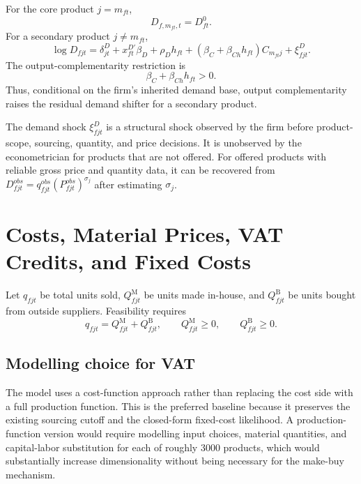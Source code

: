 \documentclass[11pt,a4paper]{article}
\newcommand{\M}{\mathrm{M}}
\newcommand{\B}{\mathrm{B}}
\begin{document}
For the core product $j=m_{ft}$,
\begin{equation}
    D_{f,m_{ft},t}=D^0_{ft}.
    \label{eq:core_demand}
\end{equation}
For a secondary product $j\neq m_{ft}$,
\begin{equation}
    \log D_{fjt}
    =\delta^D_{jt}
    +x^{D\prime}_{ft}\beta_D
    +\rho_D h_{ft}
    +\left(\beta_C+\beta_{Ch}h_{ft}\right)C_{m_{ft}j}
    +\xi^D_{fjt}.
    \label{eq:secondary_demand}
\end{equation}
The output-complementarity restriction is
\begin{equation}
    \beta_C+\beta_{Ch}h_{ft}>0.
    \label{eq:output_restriction}
\end{equation}
Thus, conditional on the firm's inherited demand base, output complementarity raises the residual demand shifter for a secondary product.

The demand shock $\xi^D_{fjt}$ is a structural shock observed by the firm before product-scope, sourcing, quantity, and price decisions. It is unobserved by the econometrician for products that are not offered. For offered products with reliable gross price and quantity data, it can be recovered from $D^{obs}_{fjt}=q^{obs}_{fjt}(P^{obs}_{fjt})^{\sigma_j}$ after estimating $\sigma_j$.

\section{Costs, Material Prices, VAT Credits, and Fixed Costs}

Let $q_{fjt}$ be total units sold, $Q^{\M}_{fjt}$ be units made in-house, and $Q^{\B}_{fjt}$ be units bought from outside suppliers. Feasibility requires
\begin{equation}
    q_{fjt}=Q^{\M}_{fjt}+Q^{\B}_{fjt},
    \qquad
    Q^{\M}_{fjt}\geq0,
    \qquad
    Q^{\B}_{fjt}\geq0.
    \label{eq:quantity_decomp}
\end{equation}

\subsection{Modelling choice for VAT}

The model uses a cost-function approach rather than replacing the cost side with a full production function. This is the preferred baseline because it preserves the existing sourcing cutoff and the closed-form fixed-cost likelihood. A production-function version would require modelling input choices, material quantities, and capital-labor substitution for each of roughly 3000 products, which would substantially increase dimensionality without being necessary for the make-buy mechanism.
\end{document}
